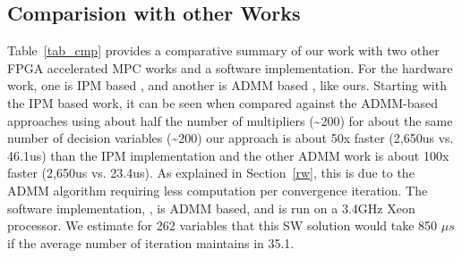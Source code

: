 \subsection{Comparision with other Works}
Table~\ref{tab_cmp} provides a comparative summary of our work with two other FPGA accelerated MPC works and a software implementation. For the hardware work, one is IPM based \cite{6927473}, and another is ADMM based \cite{jerez2014embedded}, like ours. Starting with the IPM based work, it can be seen when compared against the ADMM-based approaches using about half the number of multipliers (\textasciitilde{200}) for about the same number of decision variables (\textasciitilde{200}) our approach is about 50x faster (2,650us vs. 46.1us) than the IPM implementation and the other ADMM work \cite{jerez2014embedded} is about 100x faster (2,650us vs. 23.4us). As explained in Section~\ref{rw}, this is due to the ADMM algorithm requiring less computation per convergence iteration. The software implementation, \cite{6422363}, is ADMM based, and is run on a 3.4GHz Xeon processor. We estimate for 262 variables that this SW solution would take 850 $\mu s$ if the average number of iteration maintains in 35.1.\par
